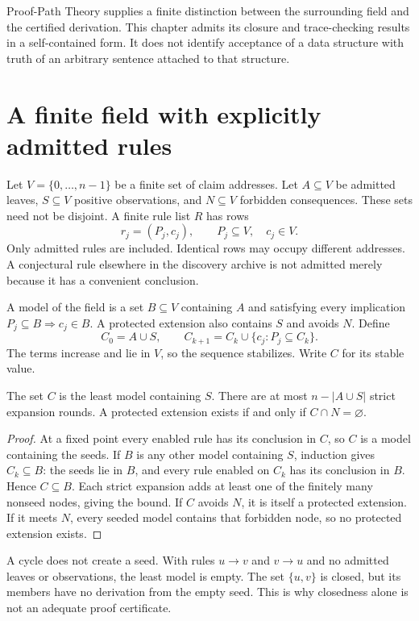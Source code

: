 Proof-Path Theory supplies a finite distinction between the surrounding field and the certified derivation. This chapter admits its closure and trace-checking results in a self-contained form. It does not identify acceptance of a data structure with truth of an arbitrary sentence attached to that structure.

\section{A finite field with explicitly admitted rules}
Let $V=\{0,\ldots,n-1\}$ be a finite set of claim addresses. Let $A\subseteq V$ be admitted leaves, $S\subseteq V$ positive observations, and $N\subseteq V$ forbidden consequences. These sets need not be disjoint. A finite rule list $R$ has rows
\[
 r_j=(P_j,c_j),\qquad P_j\subseteq V,\quad c_j\in V.
\]
Only admitted rules are included. Identical rows may occupy different addresses. A conjectural rule elsewhere in the discovery archive is not admitted merely because it has a convenient conclusion.

A model of the field is a set $B\subseteq V$ containing $A$ and satisfying every implication $P_j\subseteq B\Rightarrow c_j\in B$. A protected extension also contains $S$ and avoids $N$. Define
\[
 C_0=A\cup S,\qquad
 C_{k+1}=C_k\cup\{c_j:P_j\subseteq C_k\}.
\]
The terms increase and lie in $V$, so the sequence stabilizes. Write $C$ for its stable value.

\begin{Coreproposition}\label{Core:r:field-closure}
The set $C$ is the least model containing $S$. There are at most $n-|A\cup S|$ strict expansion rounds. A protected extension exists if and only if $C\cap N=\varnothing$.
\end{Coreproposition}
\begin{proof}
At a fixed point every enabled rule has its conclusion in $C$, so $C$ is a model containing the seeds. If $B$ is any other model containing $S$, induction gives $C_k\subseteq B$: the seeds lie in $B$, and every rule enabled on $C_k$ has its conclusion in $B$. Hence $C\subseteq B$. Each strict expansion adds at least one of the finitely many nonseed nodes, giving the bound. If $C$ avoids $N$, it is itself a protected extension. If it meets $N$, every seeded model contains that forbidden node, so no protected extension exists.
\end{proof}

A cycle does not create a seed. With rules $u\to v$ and $v\to u$ and no admitted leaves or observations, the least model is empty. The set $\{u,v\}$ is closed, but its members have no derivation from the empty seed. This is why closedness alone is not an adequate proof certificate.

